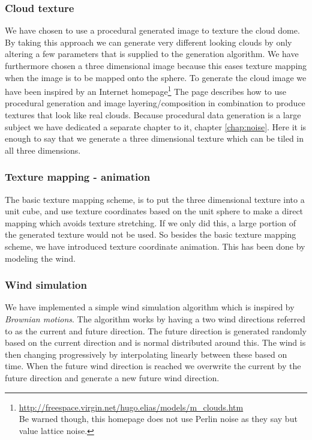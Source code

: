 \subsubsection{Cloud texture}
We have chosen to use a procedural generated image to texture the
cloud dome. By taking this approach we can generate very different
looking clouds by only altering a few parameters that is supplied to
the generation algorithm.
%
We have furthermore chosen a three dimensional image because this
eases texture mapping when the image is to be mapped onto the sphere.
%
To generate the cloud image we have been inspired by an Internet
homepage\footnote{\url{http://freespace.virgin.net/hugo.elias/models/m_clouds.htm}
  \\Be warned though, this homepage does not use Perlin noise as they
  say but value lattice noise.}  The page describes how to use
procedural generation and image layering/composition in combination to
produce textures that look like real clouds.  Because procedural data
generation is a large subject we have dedicated a separate chapter to
it, chapter \ref{chap:noise}. Here it is enough to say that we
generate a three dimensional texture which can be tiled in all three
dimensions.

\subsubsection{Texture mapping - animation}
The basic texture mapping scheme, is to put the three dimensional
texture into a unit cube, and use texture coordinates based on the
unit sphere to make a direct mapping which avoids texture stretching.
%
If we only did this, a large portion of the generated texture would
not be used.
%
So besides the basic texture mapping scheme, we have introduced
texture coordinate animation. This has been done by modeling the wind.

\subsubsection{Wind simulation}
We have implemented a simple wind simulation algorithm which is
inspired by \emph{Brownian motions}.
The algorithm works by having a two wind directions referred to as the
current and future direction. The future direction is generated
randomly based on the current direction and is normal distributed
around this. The wind is then changing progressively by interpolating
linearly between these based on time. When the future wind direction is
reached we overwrite the current by the future direction and generate
a new future wind direction.


